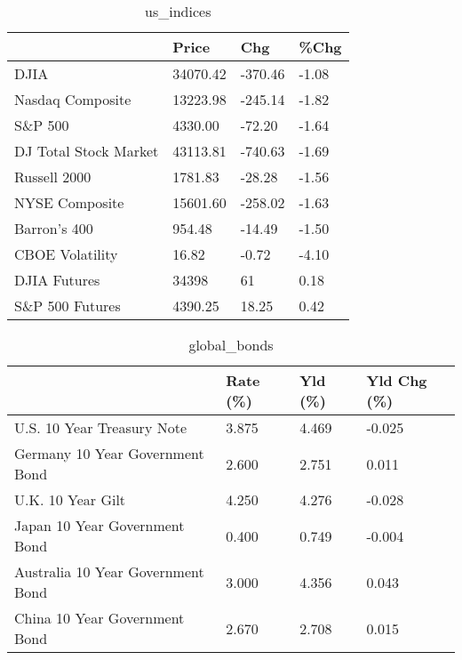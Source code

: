 \documentclass{article}%
\begin{document}
%


\begin{table}[htbp]%
\caption{us\_indices}%
\centering%
\begin{adjustbox}{width=1\textwidth}%
\begin{tabular}{llll}
\toprule
                      &    Price &     Chg &  \%Chg \\
\midrule
                 DJIA & 34070.42 & -370.46 & -1.08 \\
     Nasdaq Composite & 13223.98 & -245.14 & -1.82 \\
              S\&P 500 &  4330.00 &  -72.20 & -1.64 \\
DJ Total Stock Market & 43113.81 & -740.63 & -1.69 \\
         Russell 2000 &  1781.83 &  -28.28 & -1.56 \\
       NYSE Composite & 15601.60 & -258.02 & -1.63 \\
         Barron's 400 &   954.48 &  -14.49 & -1.50 \\
      CBOE Volatility &    16.82 &   -0.72 & -4.10 \\
         DJIA Futures &    34398 &      61 &  0.18 \\
      S\&P 500 Futures &  4390.25 &   18.25 &  0.42 \\
\bottomrule
\end{tabular}
%
\end{adjustbox}%
\end{table}

%


\begin{table}[htbp]%
\caption{global\_bonds}%
\centering%
\begin{adjustbox}{width=1\textwidth}%
\begin{tabular}{llll}
\toprule
                                  & Rate (\%) & Yld (\%) & Yld Chg (\%) \\
\midrule
       U.S. 10 Year Treasury Note &    3.875 &   4.469 &      -0.025 \\
  Germany 10 Year Government Bond &    2.600 &   2.751 &       0.011 \\
                U.K. 10 Year Gilt &    4.250 &   4.276 &      -0.028 \\
    Japan 10 Year Government Bond &    0.400 &   0.749 &      -0.004 \\
Australia 10 Year Government Bond &    3.000 &   4.356 &       0.043 \\
    China 10 Year Government Bond &    2.670 &   2.708 &       0.015 \\
\bottomrule
\end{tabular}
%
\end{adjustbox}%
\end{table}
\end{document}
